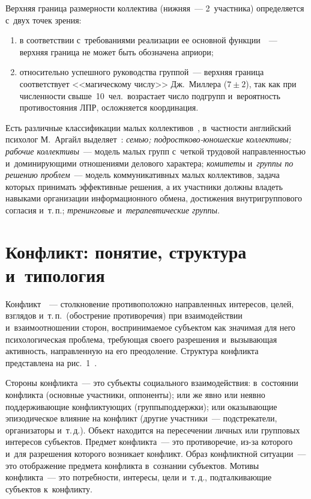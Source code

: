 \begin{multicols}{2}
  Верхняя граница размерности коллектива (нижняя~--- 2~участника) 
определяется с~двух точек зрения:
\begin{enumerate}[(1)]
\item в соответствии с~требованиями 
реализации ее основной функции~\cite{6-r}~--- верхняя граница не может быть 
обозначена априори; 
\item относительно успешного руководства группой~--- 
верхняя граница соответствует <<магическому числу>> Дж.~Миллера ($7\pm 
2$), так как при численности свыше~10~чел.\ возрастает число подгрупп 
и~вероятность противостояния ЛПР, осложняется координация.
\end{enumerate}
  
  Есть различные классификации малых коллективов~\cite{6-r}, в~частности 
английский психолог М.~Аргайл выделяет~\cite{7-r}: \textit{семью; 
подростково-юношеские коллективы; рабочие коллективы}~--- модель малых 
групп с~четкой трудовой направленностью и~доминирующими отношениями 
делового характера; \textit{комитеты} и~\textit{группы по решению  
проб\-лем}~--- модель коммуникативных малых коллективов, задача которых 
принимать эффективные решения, а их участники должны владеть навыками 
организации информационного обмена, достижения внутригруппового 
согласия и~т.\,п.; \textit{тренинговые} и~\textit{терапевтические группы}.


\vspace*{-6pt}
  
\section{Конфликт: понятие, структура и~типология}

\vspace*{-2pt}

  Конфликт~\cite{8-r, 9-r}~--- столкновение противоположно направленных 
интересов, целей, взглядов и~т.\,п.\ (обострение противоречия) при 
взаимодействии и~взаимоотношении сторон, вос\-при\-ни\-ма\-емое субъектом как 
значимая для него психологическая проблема, требующая своего разрешения 
и~вызывающая активность, направленную на его преодоление. Структура 
конфликта представлена на рис.~1~\cite{10-r, 11-r}. 



  Стороны конфликта~--- это субъекты социального взаимодействия: 
в~состоянии конфликта (основные участники, оппоненты); или же явно или 
неявно поддерживающие конфликтующих (группы\linebreak поддержки); или 
оказывающие эпизодическое влияние на конфликт (другие участники~--- 
подстрекатели, организаторы и~т.\,д.). Объект находится на пересечении 
личных или групповых интересов субъектов. Предмет конфликта~--- это 
противоречие, из-за которого и~для разрешения которого возникает конфликт. 
Образ конфликтной ситуации~--- это отображение предмета конфликта 
в~сознании субъектов. Мотивы конфликта~--- это потребности, интересы, цели 
и~т.\,д., подталкивающие субъектов к~конфликту. 
  

\end{multicols}
